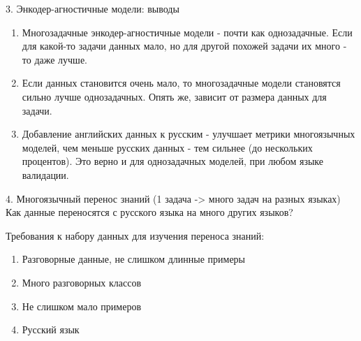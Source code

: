 \begin{frame}{3. Энкодер-агностичные модели: выводы}
\begin{enumerate}
\item Многозадачные энкодер-агностичные модели - почти как однозадачные. Если для какой-то задачи данных мало, но для другой похожей задачи их много - то даже лучше.
\item Если данных становится очень мало, то многозадачные модели становятся сильно лучше однозадачных. Опять же, зависит от размера данных для задачи.
\item Добавление английских данных к русским - улучшает метрики многоязычных моделей, чем меньше русских данных - тем сильнее (до нескольких процентов). Это верно и для однозадачных моделей, при любом языке валидации.
\end{enumerate}
\end{frame}


\begin{frame}{4. Многоязычный перенос знаний (1 задача -> много задач на разных языках)}
Как данные переносятся с русского языка на много других языков? 

Требования к набору данных для изучения переноса знаний: 
\begin{enumerate}
\item {Разговорные данные, не слишком длинные примеры}
\item {Много разговорных классов}
\item {Не слишком мало примеров}
\item{Русский язык}
\end{enumerate}
\end{frame}

